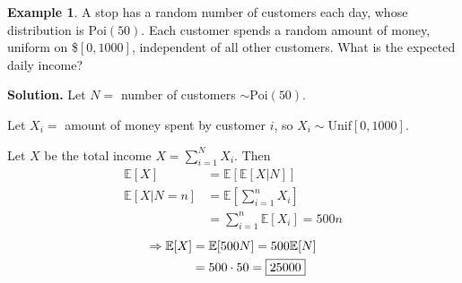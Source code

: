 \documentclass[a4paper,11pt]{amsbook}
\theoremstyle{definition}
\newtheorem{example}{\hspace{-2em} \color{darkblue} Example}[chapter]
\theoremstyle{remark}
\newcommand{\E}{\mathbb{E}}
\newcommand\0{\varnothing}
\newcommand\Poi{\text{Poi}}
\newcommand\Unif{\text{Unif}}
\begin{document}
\begin{example}
    A stop has a random number of customers each day, whose distribution is $\Poi(50)$.
    Each customer spends a random amount of money, uniform on \$$[0,1000]$,
    independent of all other customers. What is the expected daily income?

    \noindent \textbf{Solution.} Let $N=$ number of customers $\sim\Poi(50)$.

    Let $X_i=$ amount of money spent by customer $i$, so $X_i\sim\Unif[0,1000]$.

    Let $X$ be the total income $X=\sum_{i=1}^NX_i$. Then 
    \begin{align*}
        \E[X]&=\E[\E[X|N]] \\
        \E[X|N=n]&=\E\left[\sum_{i=1}^nX_i\right] \\
        &=\sum_{i=1}^n\E[X_i]=500n \tag{LoE}
    \end{align*}
    \begin{align*}
        \Rightarrow\E[X]&=\E[500N]=500\E[N] \\
        &=500\cdot50=\fbox{25000}
    \end{align*}
\end{example}
\end{document}
